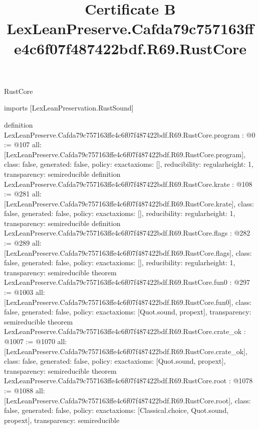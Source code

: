 \begin{lexlean}{RustCore}
\title{Certificate B LexLeanPreserve.Cafda79c757163ffe4c6f07f487422bdf.R69.RustCore}
\begin{coremodule}
imports [LexLeanPreservation.RustSound]

definition LexLeanPreserve.Cafda79c757163ffe4c6f07f487422bdf.R69.RustCore.program : @0 := @107 {
  all: [LexLeanPreserve.Cafda79c757163ffe4c6f07f487422bdf.R69.RustCore.program],
  class: false,
  generated: false,
  policy: exact{axioms: []},
  reducibility: regular{height: 1},
  transparency: semireducible
}
definition LexLeanPreserve.Cafda79c757163ffe4c6f07f487422bdf.R69.RustCore.krate : @108 := @281 {
  all: [LexLeanPreserve.Cafda79c757163ffe4c6f07f487422bdf.R69.RustCore.krate],
  class: false,
  generated: false,
  policy: exact{axioms: []},
  reducibility: regular{height: 1},
  transparency: semireducible
}
definition LexLeanPreserve.Cafda79c757163ffe4c6f07f487422bdf.R69.RustCore.flags : @282 := @289 {
  all: [LexLeanPreserve.Cafda79c757163ffe4c6f07f487422bdf.R69.RustCore.flags],
  class: false,
  generated: false,
  policy: exact{axioms: []},
  reducibility: regular{height: 1},
  transparency: semireducible
}
theorem LexLeanPreserve.Cafda79c757163ffe4c6f07f487422bdf.R69.RustCore.fun0 : @297 := @1003 {
  all: [LexLeanPreserve.Cafda79c757163ffe4c6f07f487422bdf.R69.RustCore.fun0],
  class: false,
  generated: false,
  policy: exact{axioms: [Quot.sound, propext]},
  transparency: semireducible
}
theorem LexLeanPreserve.Cafda79c757163ffe4c6f07f487422bdf.R69.RustCore.crate_ok : @1007 := @1070 {
  all: [LexLeanPreserve.Cafda79c757163ffe4c6f07f487422bdf.R69.RustCore.crate_ok],
  class: false,
  generated: false,
  policy: exact{axioms: [Quot.sound, propext]},
  transparency: semireducible
}
theorem LexLeanPreserve.Cafda79c757163ffe4c6f07f487422bdf.R69.RustCore.root : @1078 := @1088 {
  all: [LexLeanPreserve.Cafda79c757163ffe4c6f07f487422bdf.R69.RustCore.root],
  class: false,
  generated: false,
  policy: exact{axioms: [Classical.choice, Quot.sound, propext]},
  transparency: semireducible
}


\end{coremodule}
\end{lexlean}
